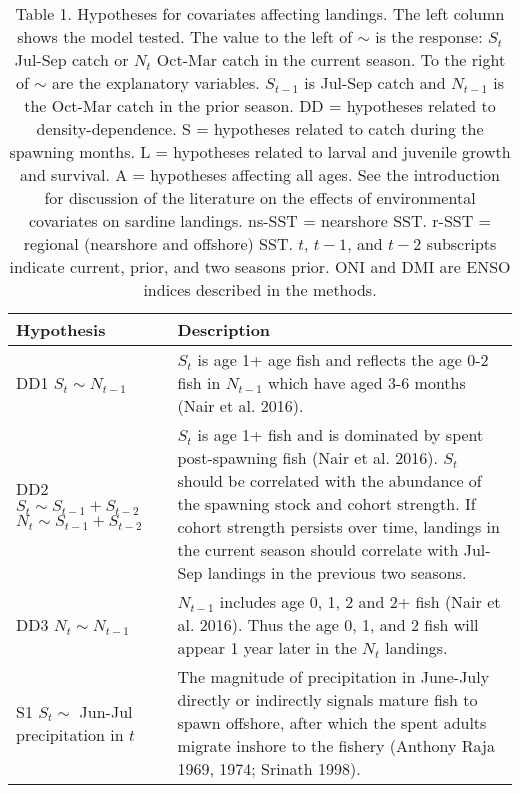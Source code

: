 

\begin{table}

\caption{\label{tab:print-table-hyp}Table 1. Hypotheses for covariates affecting landings.  The left column shows the model tested. The value to the left of $\sim$ is the response: $S_t$ Jul-Sep catch or $N_t$ Oct-Mar catch in the current season. To the right of $\sim$ are the explanatory variables. $S_{t-1}$ is Jul-Sep catch and $N_{t-1}$ is the Oct-Mar catch in the prior season. DD = hypotheses related to density-dependence. S = hypotheses related to catch during the spawning months. L = hypotheses related to larval and juvenile growth and survival. A = hypotheses affecting all ages. See the introduction for discussion of the literature on the effects of environmental covariates on sardine landings. ns-SST = nearshore SST. r-SST = regional (nearshore and offshore) SST. $t$, $t-1$, and $t-2$ subscripts indicate current, prior, and two seasons prior. ONI and DMI are ENSO indices described in the methods.}
\centering
\begin{tabular}[t]{>{\raggedright\arraybackslash}p{5.5cm}|>{\raggedright\arraybackslash}p{10cm}}
\hline
Hypothesis & Description\\
\hline
DD1 \newline $S_t \sim N_{t-1}$ & $S_t$ is age 1+ age fish and reflects the age 0-2 fish in $N_{t-1}$ which have aged 3-6 months (Nair et al. 2016).\\
\hline
DD2 \newline $S_t \sim S_{t-1} + S_{t-2}$ \newline $N_t \sim S_{t-1} + S_{t-2}$ & $S_t$ is age 1+ fish and is dominated by spent post-spawning fish (Nair et al. 2016). $S_t$ should be correlated with the abundance of the spawning stock and cohort strength. If cohort strength persists over time, landings in the current season should correlate with Jul-Sep landings in the previous two seasons.\\
\hline
DD3 \newline $N_t \sim N_{t-1}$ & $N_{t-1}$ includes age 0, 1, 2 and 2+ fish (Nair et al. 2016). Thus the age 0, 1, and 2 fish will appear 1 year later in the $N_t$ landings.\\
\hline
S1 \newline $S_t \sim$ Jun-Jul precipitation in $t$ & The magnitude of precipitation in June-July directly or indirectly signals mature fish to spawn offshore, after which the spent adults migrate inshore to the fishery (Anthony Raja 1969, 1974; Srinath 1998).\\

\end{tabular}
\end{table}
